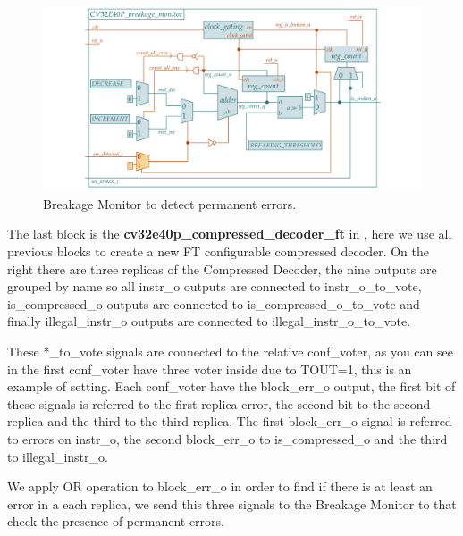 {	    \begin{figure}[H]
    		\centering
    		\includegraphics[width=1.3\textwidth,center]{./images/cv32e40p_breakage_monitor.png}
    		\caption{Breakage Monitor to detect permanent errors.}
    		\label{fig:cv32e40p_breakage_monitor}
    	\end{figure} 	
		
		The last block is the \textbf{cv32e40p\_compressed\_decoder\_ft} in , here we use all previous blocks to create a new FT configurable compressed decoder.
		On the right there are three replicas of the Compressed Decoder, the nine outputs are grouped by name so all instr\_o outputs are connected to instr\_o\_to\_vote, is\_compressed\_o outputs are connected to is\_compressed\_o\_to\_vote and finally illegal\_instr\_o outputs are connected to illegal\_instr\_o\_to\_vote.
		
		These *\_to\_vote signals are connected to the relative conf\_voter, as you can see in  the first conf\_voter have three voter inside due to TOUT=1, this is an example of setting.
		Each conf\_voter have the block\_err\_o output, the first bit of these signals is referred to the first replica error, the second bit to the second replica and the third to the third replica. The first block\_err\_o signal is referred to errors on instr\_o, the second block\_err\_o to is\_compressed\_o and the third to illegal\_instr\_o.
		
	    We apply OR operation to block\_err\_o in order to find if there is at least an error in a each replica, we send this three signals to the Breakage Monitor to that check the presence of permanent errors.
	     
}
